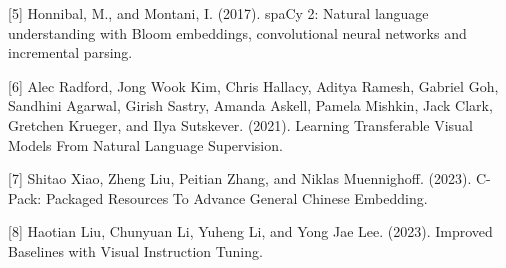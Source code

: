 \documentclass[twocolumn]{article}
\begin{document}
[5]	Honnibal, M., and Montani, I. (2017). spaCy 2: Natural language understanding with Bloom embeddings, convolutional neural networks and incremental parsing.

[6]	Alec Radford, Jong Wook Kim, Chris Hallacy, Aditya Ramesh, Gabriel Goh, Sandhini Agarwal, Girish Sastry, Amanda Askell, Pamela Mishkin, Jack Clark, Gretchen Krueger, and Ilya Sutskever. (2021). Learning Transferable Visual Models From Natural Language Supervision.

[7]	Shitao Xiao, Zheng Liu, Peitian Zhang, and Niklas Muennighoff. (2023). C-Pack: Packaged Resources To Advance General Chinese Embedding.

[8]	Haotian Liu, Chunyuan Li, Yuheng Li, and Yong Jae Lee. (2023). Improved Baselines with Visual Instruction Tuning.
\end{document}
